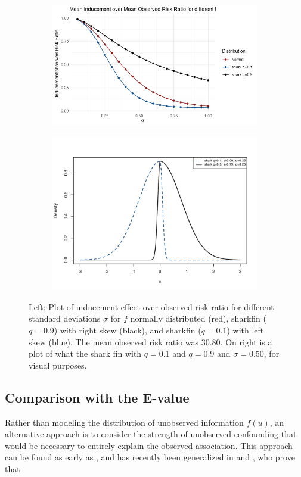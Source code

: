 \documentclass[aoas,preprint, 11pt, dvipsnames, table, x11name]{imsart}
\theoremstyle{remark}
\begin{document}
\begin{figure}[!httb]
	\centering 
		\begin{subfigure}{.5\textwidth}
	\includegraphics[width=7.cm]{induceoverrisk}
		\end{subfigure}%
		\begin{subfigure}{.5\textwidth}
			\includegraphics[width=7.cm]{diff_shark_plots}
		\end{subfigure}
	\caption{Left: Plot of inducement effect over observed risk ratio for different standard deviations $\sigma$ for $f$ normally distributed (red), sharkfin ($q=0.9$) with right skew (black), and sharkfin ($q=0.1$) with left skew (blue). The mean observed risk ratio was 30.80. On right is a plot of what the shark fin with $q=0.1$ and $q=0.9$ and $\sigma=0.50$, for visual purposes. }%
	\label{f_explain_plots}
\end{figure}







\subsection{Comparison with the E-value}\label{E-value-comparison}
Rather than modeling the distribution of unobserved information $f(u)$, an alternative approach is to consider the strength of unobserved confounding that would be necessary to entirely explain the observed association. This approach can be found as early as \cite{Cornfield}, and has recently been generalized in \cite{evalue} and \cite{Peng-2016}, who prove that 
\end{document}
